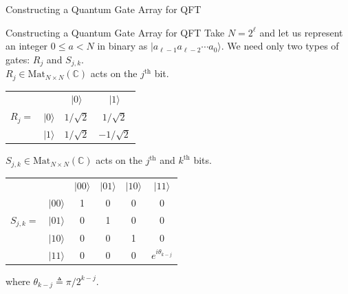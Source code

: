 \documentclass{beamer}
\newcommand{\mbb}[1]{\mathbb{#1}}
\newcommand{\mrm}[1]{\mathrm{#1}}
\renewcommand{\:}{\text{ }}
\begin{document}
    \begin{frame}{Constructing a Quantum Gate Array for QFT}
        \begin{block}{Constructing a Quantum Gate Array for QFT}
            Take $N = 2^\ell$ and let us represent an integer $0 \leq a < N$ in binary as $\vert a_{\ell-1} a_{\ell-2} \cdots a_0 \rangle$.
            We need only two types of gates: $R_j$ and $S_{j,k}$.\\[.4em]
            $R_j \in \mrm{Mat}_{N \times N}(\mbb{C})$ acts on the $j^\text{th}$ bit. \\[-.5em] \small
            \begin{table}
                \centering
                \begin{tabular}{rccc}
                           &                                        & $\vert 0 \rangle$ & $\vert 1 \rangle$                  \\
                    $R_j=$ & \multicolumn{1}{c|}{$\vert 0 \rangle$} & $1/\sqrt{2}$      & \multicolumn{1}{c|}{$1/\sqrt{2}$}  \\
                           & \multicolumn{1}{c|}{$\vert 1 \rangle$} & $1/\sqrt{2}$      & \multicolumn{1}{c|}{$-1/\sqrt{2}$}
                \end{tabular}
            \end{table} \vspace*{-.5em} \normalsize
            $S_{j,k} \in \mrm{Mat}_{N \times N}(\mbb{C})$ acts on the $j^\text{th}$ and $k^\text{th}$ bits.\\[-.5em] \small
            \begin{table}
                \centering
                \begin{tabular}{rccccc}
                               &                                         & $\vert 00 \rangle$ & $\vert 01 \rangle$ & $\vert 10 \rangle$ & $\vert 11 \rangle$                        \\
                               & \multicolumn{1}{c|}{$\vert 00 \rangle$} & 1                  & 0                  & 0                  & \multicolumn{1}{c|}{0}                    \\
                    $S_{j,k}=$ & \multicolumn{1}{c|}{$\vert 01 \rangle$} & 0                  & 1                  & 0                  & \multicolumn{1}{c|}{0}                    \\
                               & \multicolumn{1}{c|}{$\vert 10 \rangle$} & 0                  & 0                  & 1                  & \multicolumn{1}{c|}{0}                    \\
                               & \multicolumn{1}{c|}{$\vert 11 \rangle$} & 0                  & 0                  & 0                  & \multicolumn{1}{c|}{$e^{i \theta_{k-j}}$}
                \end{tabular}
            \end{table}\vspace*{-.5em} \normalsize
            where $\theta_{k-j} \triangleq \pi / 2^{k-j}$.
        \end{block}
    \end{frame}
\end{document}
